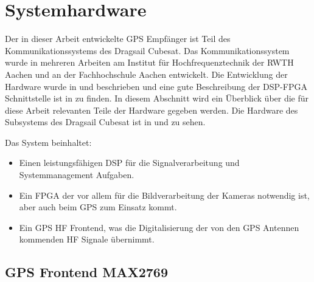 \section{Systemhardware}
Der in dieser Arbeit entwickelte GPS Empfänger ist Teil des Kommunikationssystems des Dragsail Cubesat. Das Kommunikationssystem wurde in mehreren Arbeiten am Institut für Hochfrequenztechnik der RWTH Aachen und an der Fachhochschule Aachen entwickelt. Die Entwicklung der \comboard Hardware wurde in \cite{DragsailKaiMA} und \cite{DragsailMattiMA} beschrieben und eine gute Beschreibung der DSP-FPGA Schnittstelle ist in \cite{DragsailAndrejMA} zu finden.
In diesem Abschnitt wird ein Überblick über die für diese Arbeit relevanten Teile der \comboard Hardware gegeben werden. Die Hardware des \comboard Subsystems des Dragsail Cubesat ist in  und  zu sehen. 

Das System beinhaltet: 
\begin{itemize}
\item Einen leistungsfähigen \gls{DSP} für die Signalverarbeitung und Systemmanagement Aufgaben.
\item Ein \gls{FPGA} der vor allem für die Bildverarbeitung der Kameras notwendig ist, aber auch beim GPS zum Einsatz kommt.
\item Ein GPS HF Frontend, was die Digitalisierung der von den GPS Antennen kommenden HF Signale übernimmt.
\end{itemize}




\subsection{GPS Frontend MAX2769}

 

